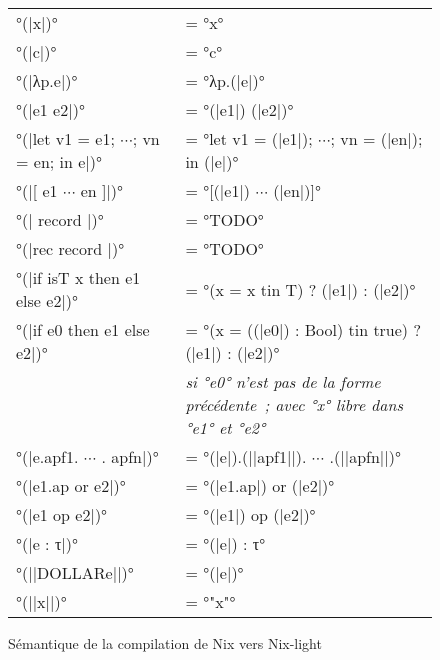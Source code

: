 \begin{figure}
  \begin{tabular}{ll}
    °(|x|)° &= °x° \\
    °(|c|)° &= °c°\\
    °(|λp.e|)° &= °λp.(|e|)°\\
    °(|e1 e2|)° &= °(|e1|) (|e2|)°\\
    °(|let v1 = e1; $\cdots$; vn = en; in e|)° &=
      °let v1 = (|e1|); $\cdots$; vn = (|en|); in (|e|)°\\
    °(|[ e1 $\cdots$ en ]|)° &= °[(|e1|) $\cdots$ (|en|)]°\\
    °(|{ record }|)° &= °TODO°\\
    °(|rec { record }|)° &= °TODO°\\
    °(|if isT x then e1 else e2|)° &= °(x = x tin T) ? (|e1|) : (|e2|)°\\
    °(|if e0 then e1 else e2|)° &=
      °(x = ((|e0|) : Bool) tin true) ? (|e1|) : (|e2|)°\\
    &{\itshape
      si °e0° n'est pas de la forme précédente ;
      avec °x° libre dans °e1° et °e2°}\\
    °(|e.apf1. $\cdots$ . apfn|)° &= °(|e|).(||apf1||). $\cdots$ .(||apfn||)°\\
    °(|e1.ap or e2|)° &= °(|e1.ap|) or (|e2|)°\\
    °(|e1 op e2|)° &= °(|e1|) op (|e2|)°\\
    °(|e : τ|)° &= °(|e|) : τ°\\

    °(||DOLLAR{e}||)° &= °(|e|)°\\
    °(||x||)° &= °"x"°
  \end{tabular}
  \caption{Sémantique de la compilation de Nix vers Nix-light}\label{nix-light::compilation}
\end{figure}
